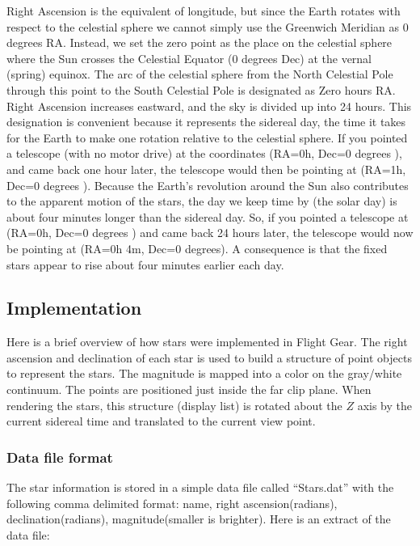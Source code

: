 \documentclass[12pt]{article}
\begin{document}
Right Ascension is the equivalent of longitude, but since the Earth
rotates with respect to the celestial sphere we cannot simply use the
Greenwich Meridian as 0 degrees RA. Instead, we set the zero point as
the place on the celestial sphere where the Sun crosses the Celestial
Equator (0 degrees Dec) at the vernal (spring) equinox.  The arc of
the celestial sphere from the North Celestial Pole through this point
to the South Celestial Pole is designated as Zero hours RA. Right
Ascension increases eastward, and the sky is divided up into 24
hours. This designation is convenient because it represents the
sidereal day, the time it takes for the Earth to make one rotation
relative to the celestial sphere. If you pointed a telescope (with no
motor drive) at the coordinates (RA=0h, Dec=0 degrees ), and came back
one hour later, the telescope would then be pointing at (RA=1h, Dec=0
degrees ). Because the Earth's revolution around the Sun also
contributes to the apparent motion of the stars, the day we keep time
by (the solar day) is about four minutes longer than the sidereal
day. So, if you pointed a telescope at (RA=0h, Dec=0 degrees ) and
came back 24 hours later, the telescope would now be pointing at
(RA=0h 4m, Dec=0 degrees). A consequence is that the fixed stars
appear to rise about four minutes earlier each day.


\subsection{Implementation}

Here is a brief overview of how stars were implemented in Flight Gear.
The right ascension and declination of each star is used to build a
structure of point objects to represent the stars.  The magnitude is
mapped into a color on the gray/white continuum.  The points are
positioned just inside the far clip plane.  When rendering the stars,
this structure (display list) is rotated about the $Z$ axis by the
current sidereal time and translated to the current view point.

\subsubsection{Data file format}

The star information is stored in a simple data file called
``Stars.dat'' with the following comma delimited format: name, right
ascension(radians), declination(radians), magnitude(smaller is
brighter).  Here is an extract of the data file:
\end{document}
